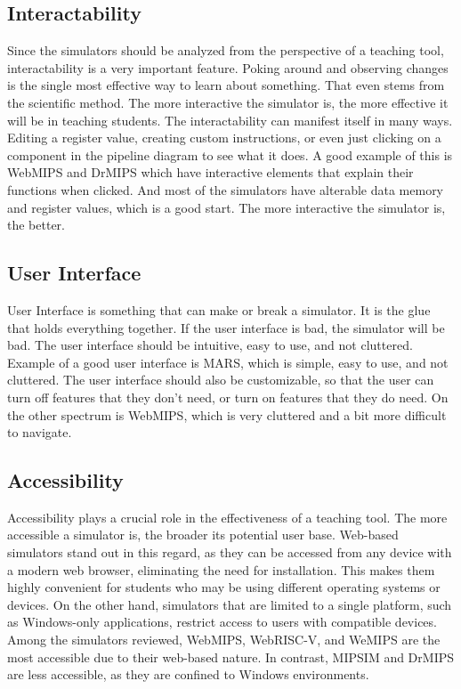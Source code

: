 \subsection{Interactability}\label{sec:interactability}
Since the simulators should be analyzed from the perspective of a teaching tool, interactability is a very important feature. Poking around and observing changes is the single most effective way to learn about something. That even stems from the scientific method. The more interactive the simulator is, the more effective it will be in teaching students. The interactability can manifest itself in many ways. Editing a register value, creating custom instructions, or even just clicking on a component in the pipeline diagram to see what it does. A good example of this is WebMIPS and DrMIPS which have interactive elements that explain their functions when clicked. And most of the simulators have alterable data memory and register values, which is a good start. The more interactive the simulator is, the better.

\subsection{User Interface}\label{sec:user_interface}
User Interface is something that can make or break a simulator. It is the glue that holds everything together. If the user interface is bad, the simulator will be bad. The user interface should be intuitive, easy to use, and not cluttered. Example of a good user interface is MARS, which is simple, easy to use, and not cluttered. The user interface should also be customizable, so that the user can turn off features that they don't need, or turn on features that they do need. On the other spectrum is WebMIPS, which is very cluttered and a bit more difficult to navigate. 

\subsection{Accessibility}\label{sec:accessibility}
Accessibility plays a crucial role in the effectiveness of a teaching tool. The more accessible a simulator is, the broader its potential user base. Web-based simulators stand out in this regard, as they can be accessed from any device with a modern web browser, eliminating the need for installation. This makes them highly convenient for students who may be using different operating systems or devices. On the other hand, simulators that are limited to a single platform, such as Windows-only applications, restrict access to users with compatible devices. Among the simulators reviewed, WebMIPS, WebRISC-V, and WeMIPS are the most accessible due to their web-based nature. In contrast, MIPSIM and DrMIPS are less accessible, as they are confined to Windows environments.


